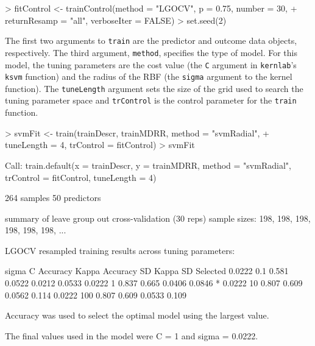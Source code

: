 \documentclass[12pt]{article}
\begin{document}
\begin{small}
\begin{Schunk}
\begin{Sinput}
> fitControl <- trainControl(method = "LGOCV", p = 0.75, number = 30, 
+     returnResamp = "all", verboseIter = FALSE)
> set.seed(2)
\end{Sinput}
\end{Schunk}
\end{small}


The first two arguments to \texttt{train} are the predictor and outcome data objects, respectively. The third argument, \texttt{method}, specifies the type of model. For this model, the tuning parameters are the cost value (the \texttt{C} argument in \texttt{kernlab}'s \texttt{ksvm} function) and the radius of the RBF (the \texttt{sigma} argument to the kernel function). The \texttt{tuneLength} argument sets the size of the grid used to search the tuning parameter space and \texttt{trControl} is the control parameter for the \texttt{train} function. 

\begin{small}
\begin{Schunk}
\begin{Sinput}
> svmFit <- train(trainDescr, trainMDRR, method = "svmRadial", 
+     tuneLength = 4, trControl = fitControl)
> svmFit
\end{Sinput}
\begin{Soutput}
Call:
train.default(x = trainDescr, y = trainMDRR, method = "svmRadial", 
    trControl = fitControl, tuneLength = 4)

264 samples
50 predictors

summary of leave group out cross-validation (30 reps) sample sizes:
    198, 198, 198, 198, 198, 198, ... 

LGOCV resampled training results across tuning parameters:

  sigma   C    Accuracy  Kappa   Accuracy SD  Kappa SD  Selected
  0.0222  0.1  0.581     0.0522  0.0212       0.0533            
  0.0222  1    0.837     0.665   0.0406       0.0846    *       
  0.0222  10   0.807     0.609   0.0562       0.114             
  0.0222  100  0.807     0.609   0.0533       0.109             

Accuracy was used to select the optimal model using the largest value.

The final values used in the model were C = 1 and sigma = 0.0222.
\end{Soutput}
\end{Schunk}
\end{small}
\end{document}
